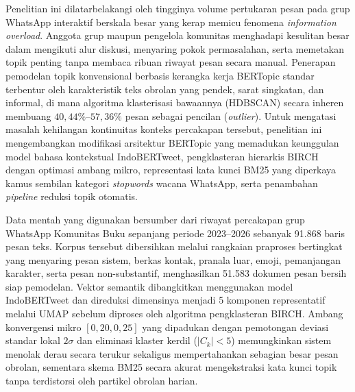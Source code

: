 

\noindent Penelitian ini dilatarbelakangi oleh tingginya volume pertukaran pesan pada grup WhatsApp interaktif berskala besar yang kerap memicu fenomena \textit{information overload}. Anggota grup maupun pengelola komunitas menghadapi kesulitan besar dalam mengikuti alur diskusi, menyaring pokok permasalahan, serta memetakan topik penting tanpa membaca ribuan riwayat pesan secara manual. Penerapan pemodelan topik konvensional berbasis kerangka kerja BERTopic standar terbentur oleh karakteristik teks obrolan yang pendek, sarat singkatan, dan informal, di mana algoritma klasterisasi bawaannya (HDBSCAN) secara inheren membuang $40{,}44\%$--$57{,}36\%$ pesan sebagai pencilan (\textit{outlier}). Untuk mengatasi masalah kehilangan kontinuitas konteks percakapan tersebut, penelitian ini mengembangkan modifikasi arsitektur BERTopic yang memadukan keunggulan model bahasa kontekstual IndoBERTweet, pengklasteran hierarkis BIRCH dengan optimasi ambang mikro, representasi kata kunci BM25 yang diperkaya kamus sembilan kategori \textit{stopwords} wacana WhatsApp, serta penambahan \textit{pipeline} reduksi topik otomatis.

Data mentah yang digunakan bersumber dari riwayat percakapan grup WhatsApp Komunitas Buku sepanjang periode 2023--2026 sebanyak 91.868 baris pesan teks. Korpus tersebut dibersihkan melalui rangkaian praproses bertingkat yang menyaring pesan sistem, berkas kontak, pranala luar, emoji, pemanjangan karakter, serta pesan non-substantif, menghasilkan 51.583 dokumen pesan bersih siap pemodelan. Vektor semantik dibangkitkan menggunakan model IndoBERTweet dan direduksi dimensinya menjadi 5 komponen representatif melalui UMAP sebelum diproses oleh algoritma pengklasteran BIRCH. Ambang konvergensi mikro $[0{,}20, 0{,}25]$ yang dipadukan dengan pemotongan deviasi standar lokal $2\sigma$ dan eliminasi klaster kerdil ($|C_k| < 5$) memungkinkan sistem menolak derau secara terukur sekaligus mempertahankan sebagian besar pesan obrolan, sementara skema BM25 secara akurat mengekstraksi kata kunci topik tanpa terdistorsi oleh partikel obrolan harian.

